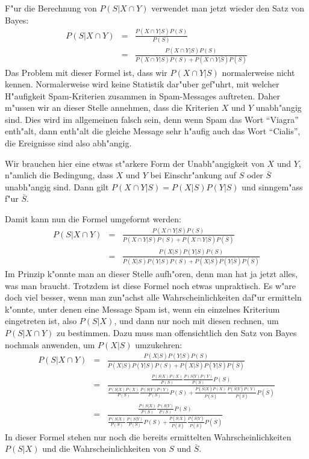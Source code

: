 F"ur die Berechnung von $P(S|X\cap Y)$ verwendet man jetzt wieder
den Satz von Bayes:
\begin{eqnarray}
P(S|X\cap Y)&=&\frac{P(X\cap Y|S)P(S)}{P(S)}\nonumber\\
&=&\frac{P(X\cap Y|S)P(S)}{P(X\cap Y|S)P(S)+P(X\cap Y|\bar S)P(\bar S)}
\end{eqnarray}
Das Problem mit dieser Formel ist, dass wir $P(X\cap Y|S)$ normalerweise
nicht kennen. Normalerweise wird keine Statistik dar"uber gef"uhrt, mit
welcher H"aufigkeit Spam-Kriterien zusammen in Spam-Messages auftreten.
Daher m"ussen wir an dieser Stelle annehmen, dass die Kriterien $X$ und $Y$
unabh"angig sind. Dies wird im allgemeinen falsch sein, denn wenn Spam
das Wort ``Viagra'' enth"alt, dann enth"alt die gleiche Message sehr h"aufig
auch das Wort ``Cialis'', die Ereignisse sind also abh"angig.

Wir brauchen hier eine etwas st"arkere Form der Unabh"angigkeit von $X$ und $Y$,
n"amlich die Bedingung, dass $X$ und $Y$ bei Einschr"ankung auf $S$
oder $\bar S$ unabh"angig sind. Dann gilt $P(X\cap Y|S)=P(X|S)P(Y|S)$
und sinngem"ass f"ur $\bar S$.

Damit kann nun die Formel umgeformt werden:
\begin{eqnarray}
P(S|X\cap Y)&=&\frac{P(X\cap Y|S)P(S)}{P(X\cap Y|S)P(S)+P(X\cap Y|\bar S)P(\bar S)}\nonumber\\
&=&\frac{P(X|S)P(Y|S)P(S)}{P(X|S)P(Y|S)P(S)+P(X|\bar S)P(Y|\bar S)P(\bar S)}
\end{eqnarray}
Im Prinzip k"onnte man an dieser Stelle aufh"oren, denn man hat ja jetzt
alles, was man braucht. Trotzdem ist diese Formel noch etwas unpraktisch.
Es w"are doch viel besser, wenn man zun"achst alle Wahrscheinlichkeiten
daf"ur ermitteln k"onnte, unter denen eine Message Spam ist, wenn ein
einzelnes Kriterium eingetreten ist, also $P(S|X)$, und dann nur noch
mit diesen rechnen, um $P(S|X\cap Y)$ zu bestimmen.
Dazu muss man offensichtlich den Satz von Bayes nochmals anwenden, um
$P(X|S)$ umzukehren:
\begin{eqnarray}
P(S|X\cap Y)&=&\frac{P(X|S)P(Y|S)P(S)}{P(X|S)P(Y|S)P(S)+P(X|\bar S)P(Y|\bar S)P(\bar S)}\nonumber\\
&=&\frac{
\frac{P(S|X)P(X)}{P(S)}
\frac{P(S|Y)P(Y)}{P(S)}P(S)
}{
\frac{P(S|X)P(X)}{P(S)}
\frac{P(S|Y)P(Y)}{P(S)}P(S)
+
\frac{P(\bar S|X)P(X)}{P(\bar S)}
\frac{P(\bar S|Y)P(Y)}{P(\bar S)}P(\bar S)
}\nonumber\\
&=&\frac{
\frac{P(S|X)}{P(S)}
\frac{P(S|Y)}{P(S)}P(S)
}{
\frac{P(S|X)}{P(S)}
\frac{P(S|Y)}{P(S)}P(S)
+
\frac{P(\bar S|X)}{P(\bar S)}
\frac{P(\bar S|Y)}{P(\bar S)}P(\bar S)
}
\end{eqnarray}
In dieser Formel stehen nur noch die bereits ermittelten Wahrscheinlichkeiten
$P(S|X)$ und die Wahrscheinlichkeiten von $S$ und $\bar S$.

